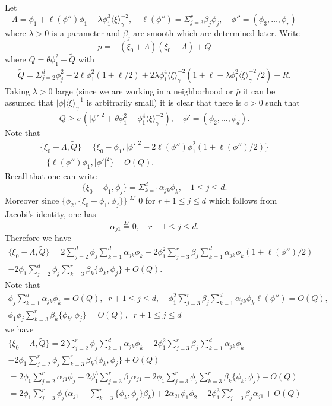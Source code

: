 \documentclass[12pt,leqno]{article} %
\def\al{\alpha}
\def\be{\beta}
\def\sieq{\overset{\Sigma'}{=}}
\def\xig{\langle{\xi}\rangle_{\!\gamma}}
\def\La{\Lambda}
\def\la{\lambda}
\def\bro{\bar\rho}
\def\bro{\bar\rho}
\numberwithin{equation}{section}
\begin{document}
%
%
Let
%
\[
\La=\phi_1+\ell(\phi'')\phi_1-\la\phi_1^3\xig^{-2},\quad \ell(\phi'')=\Sigma_{j=3}^r\be_j\phi_j,\quad\phi''=(\phi_3,\ldots,\phi_r)
\]
%
where $\la>0$ is a parameter and $\be_j$ are smooth which are determined later. Write
%
\[
p=-(\xi_0+\La)(\xi_0-\La)+Q
\]
%
where $
Q=\theta\phi_1^2+\tilde Q$ 
with
%
\begin{gather*}
\tilde Q=\Sigma_{j=2}^d\phi_j^2-2\ell\phi_1^2(1+\ell/2)+2\la\phi_1^4\xig^{-2}(1+\ell-\la\phi_1^2\xig^{-2}/2)+R.
\end{gather*}
%
Taking $\la>0$ large (since we are working in a neighborhood or $\bro$ it can be assumed that $|\phi|\xig^{-1}$ is arbitrarily small) it is clear that there is $c>0$ such that
%
\[
 Q\geq c\,(|\phi'|^2+\theta\phi_1^2+\phi_1^4\xig^{-2}),\quad \phi'=(\phi_2,\ldots,\phi_d).
\]
%
Note that
%
\begin{gather*}
\{\xi_0-\La, \tilde Q\}=\{\xi_0-\phi_1, |\phi'|^2-2\ell(\phi'') \phi^2_1(1+\ell(\phi'')/2)\}\\
-\{\ell(\phi'')\phi_1,|\phi'|^2\}+O(Q).
\end{gather*}
%
Recall that one can write
%
\[
\{\xi_0-\phi_1,\phi_j\}=\Sigma_{k=1}^d\al_{jk}\phi_k,\quad 1\leq j\leq d.
\]
%
Moreover since $\{\phi_2,\{\xi_0-\phi_1,\phi_j\}\}\sieq 0$ for $r+1\leq j\leq d$ which follows from Jacobi's identity, one has
%
\[
\al_{j1}\sieq 0,\quad r+1\leq j\leq d.
\]
%
Therefore we have
%
%
\begin{gather*}
\{\xi_0-\La, \tilde Q\}=2\sum_{j=2}^d\phi_j\sum_{k=1}^d\al_{jk}\phi_k-2\phi_1^2\sum_{j=3}^r\be_j\sum_{k=1}^d\al_{jk}\phi_k(1+\ell(\phi'')/2)\\
-2\phi_1\sum_{j=2}^d\phi_j\sum_{k=3}^r\be_k\{\phi_k,\phi_j\}+O(Q).
\end{gather*}
%
%
Note that
%
\begin{gather*}
\phi_j\sum_{k=1}^d\al_{jk}\phi_k=O(Q),\;\;r+1\leq j\leq d,\quad
\phi_1^2\sum_{j=3}^r\be_j\sum_{k=1}^d\al_{jk}\phi_k\ell(\phi'')=O(Q),\\
\phi_1\phi_j\sum_{k=3}^r\be_k\{\phi_k,\phi_j\}=O(Q),\;\;r+1\leq j\leq d
\end{gather*}
%
we have
%
\begin{gather*}
\{\xi_0-\La, \tilde Q\}=2\sum_{j=2}^r\phi_j\sum_{k=1}^d\al_{jk}\phi_k-2\phi_1^2\sum_{j=3}^r\be_j\sum_{k=1}^d\al_{jk}\phi_k\\
-2\phi_1\sum_{j=2}^r\phi_j\sum_{k=3}^r\be_k\{\phi_k,\phi_j\}+O(Q)\\
=2\phi_1\sum_{j=2}^r\al_{j1}\phi_j-2\phi_1^3\sum_{j=3}^r\be_j\al_{j1}
-2\phi_1\sum_{j=3}^r\phi_j\sum_{k=3}^r\be_k\{\phi_k,\phi_j\}+O(Q)\\
=2\phi_1\sum_{j=3}^r\phi_j\Big(\al_{j1}-\sum_{k=3}^r\{\phi_k,\phi_j\}\be_k\Big)+2\al_{21}\phi_1\phi_2-2\phi_1^3\sum_{j=3}^r\be_j\al_{j1}+O(Q)
\end{gather*}
\end{document}
